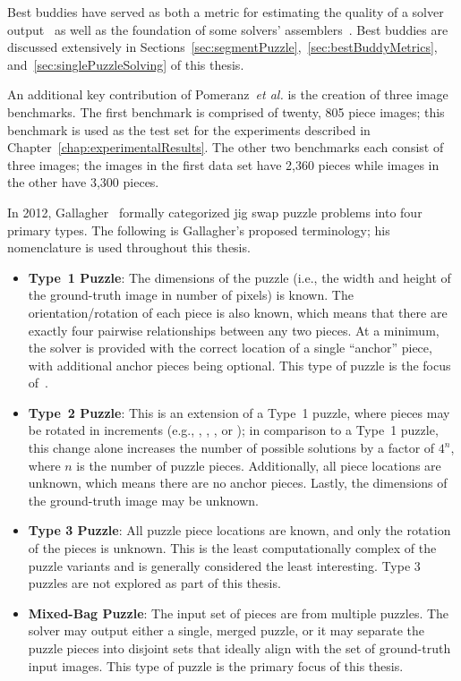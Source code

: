Best buddies have served as both a metric for estimating the quality of a solver output~\cite{sholomon2013} as well as the foundation of some solvers' assemblers~\cite{paikin2015}.  Best buddies are discussed extensively in Sections~\ref{sec:segmentPuzzle},~\ref{sec:bestBuddyMetrics}, and~\ref{sec:singlePuzzleSolving} of this thesis.

An additional key contribution of Pomeranz~\textit{et al.} is the creation of three image benchmarks.  The first benchmark is comprised of twenty, 805 piece images; this benchmark is used as the test set for the experiments described in Chapter~\ref{chap:experimentalResults}. The other two benchmarks each consist of three images; the images in the first data set have 2,360 pieces while images in the other have 3,300 pieces.

In 2012, Gallagher~\cite{gallagher2012} formally categorized jig swap puzzle problems into four primary types.  The following is Gallagher's proposed terminology; his nomenclature is used throughout this thesis.

\begin{itemize}

	\item \textbf{Type~1 Puzzle}: The dimensions of the puzzle (i.e., the width and height of the ground-truth image in number of pixels) is known.  The orientation/rotation of each piece is also known, which means that there are exactly four pairwise relationships between any two pieces.  At a minimum, the solver is provided with the correct location of a single ``anchor'' piece, with additional anchor pieces being optional.  This type of puzzle is the focus of~\cite{cho2010, pomeranz2011}.
	
	\item \textbf{Type~2 Puzzle}: This is an extension of a Type~1 puzzle, where pieces may be rotated in  increments (e.g., , , , or ); in comparison to a Type~1 puzzle, this change alone increases the number of possible solutions by a factor of $4^n$, where $n$ is the number of puzzle pieces.  Additionally, all piece locations are unknown, which means there are no anchor pieces.  Lastly, the dimensions of the ground-truth image may be unknown.
	
	\item \textbf{Type 3 Puzzle}: All puzzle piece locations are known, and only the rotation of the pieces is unknown.  This is the least computationally complex of the puzzle variants and is generally considered the least interesting.  Type 3 puzzles are not explored as part of this thesis.
	
	\item \textbf{Mixed-Bag Puzzle}: The input set of pieces are from multiple puzzles.  The solver may output either a single, merged puzzle, or it may separate the puzzle pieces into disjoint sets that ideally align with the set of ground-truth input images.  This type of puzzle is the primary focus of this thesis.

\end{itemize}

